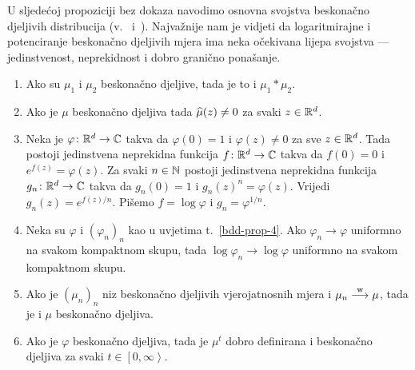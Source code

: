 \documentclass[main.tex]{subfiles}
\begin{document}
U sljedećoj propoziciji bez dokaza navodimo osnovna svojstva beskonačno djeljivih distribucija (v.~\cite[]{sato} i~\cite[,14]{sarapa}).
Najvažnije nam je vidjeti da logaritmirajne i potenciranje beskonačno djeljivih mjera ima neka očekivana lijepa svojstva --- jedinstvenost, neprekidnost i dobro granično ponašanje.
\begin{propozicija} \label{bdd-prop}
	\begin{enumerate}[label=(\roman*)]
		\item Ako su \( \mu_1 \) i \( \mu_2 \) beskonačno djeljive, tada je to i \( \mu_1 * \mu_2 \).
		\item Ako je \( \mu \) beskonačno djeljiva tada \( \widehat{\mu} (z) \neq 0 \) za svaki \( z \in \mathbb{R}^d \). \label{bdd-prop-2}
		\item Neka je \( \varphi \colon \mathbb{R}^d \to \mathbb{C} \) takva da \( \varphi(0) = 1 \) i \( \varphi(z) \neq 0 \) za sve \( z \in \mathbb{R}^d \).
		      Tada postoji jedinstvena neprekidna funkcija \( f \colon \mathbb{R}^d \to \mathbb{C} \) takva da \( f(0)=0 \) i \( e^{f(z)} = \varphi(z) \).
		      Za svaki \( n \in \mathbb{N} \) postoji jedinstvena neprekidna funkcija \( g_n \colon \mathbb{R}^d \to \mathbb{C} \) takva da \( g_n(0) = 1 \) i
		      \( g_n(z)^n = \varphi(z) \). Vrijedi \( g_n(z) = e^{f(z)/n} \). Pišemo \( f = \log \varphi \) i \( g_n = \varphi^{1/n} \). \label{bdd-prop-4}
		\item Neka su \( \varphi \) i \( (\varphi_n)_n \) kao u uvjetima t.~\ref{bdd-prop-4}. Ako \( \varphi_n \rightarrow \varphi \) uniformno
		      na svakom kompaktnom skupu, tada \( \log \varphi_n \rightarrow \log \varphi \) uniformno na svakom kompaktnom skupu.
		\item Ako je \( (\mu_n)_n \) niz beskonačno djeljivih vjerojatnosnih mjera i \( \mu_n \stackrel{\mathrm w}{\longrightarrow} \mu \), tada je i \( \mu \) beskonačno djeljiva.
		\item Ako je \( \varphi \) beskonačno djeljiva, tada je \( \mu^t \) dobro definirana i beskonačno djeljiva za svaki \( t \in \left[ 0, \infty \right\rangle \). \label{bdd-prop-6}
	\end{enumerate}
\end{propozicija}
\end{document}
